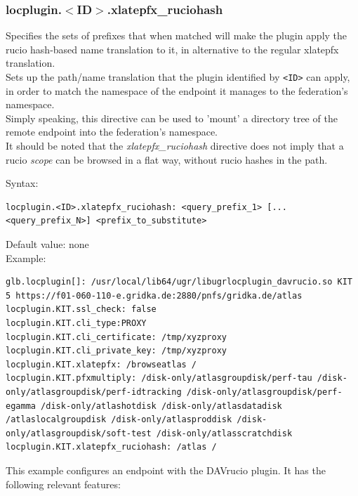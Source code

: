 \documentclass[12pt]{article} %
\begin{document}
\subsubsection{locplugin.$<$ID$>$.xlatepfx\_ruciohash}

Specifies the sets of prefixes that when matched will make the plugin apply the rucio hash-based name translation to it, in alternative to the regular xlatepfx translation.\\
Sets up the path/name translation that the plugin identified by \lstinline"<ID>" can apply, in order to match the namespace of the endpoint it manages to the federation's namespace.\\
Simply speaking, this directive can be used to 'mount' a directory tree of the remote endpoint into the federation's namespace.\\

It should be noted that the \textit{xlatepfx\_ruciohash} directive does not imply that a rucio \textit{scope} can be browsed in a flat way, without rucio hashes in the path.


Syntax:\\
\begin{lstlisting}
locplugin.<ID>.xlatepfx_ruciohash: <query_prefix_1> [... <query_prefix_N>] <prefix_to_substitute>
\end{lstlisting}

Default value: none\\

Example:\\
\begin{lstlisting}
glb.locplugin[]: /usr/local/lib64/ugr/libugrlocplugin_davrucio.so KIT 5 https://f01-060-110-e.gridka.de:2880/pnfs/gridka.de/atlas
locplugin.KIT.ssl_check: false
locplugin.KIT.cli_type:PROXY
locplugin.KIT.cli_certificate: /tmp/xyzproxy
locplugin.KIT.cli_private_key: /tmp/xyzproxy
locplugin.KIT.xlatepfx: /browseatlas /
locplugin.KIT.pfxmultiply: /disk-only/atlasgroupdisk/perf-tau /disk-only/atlasgroupdisk/perf-idtracking /disk-only/atlasgroupdisk/perf-egamma /disk-only/atlashotdisk /disk-only/atlasdatadisk /atlaslocalgroupdisk /disk-only/atlasproddisk /disk-only/atlasgroupdisk/soft-test /disk-only/atlasscratchdisk
locplugin.KIT.xlatepfx_ruciohash: /atlas /
\end{lstlisting}

This example configures an endpoint with the DAVrucio plugin. It has the following relevant features:
\end{document}
